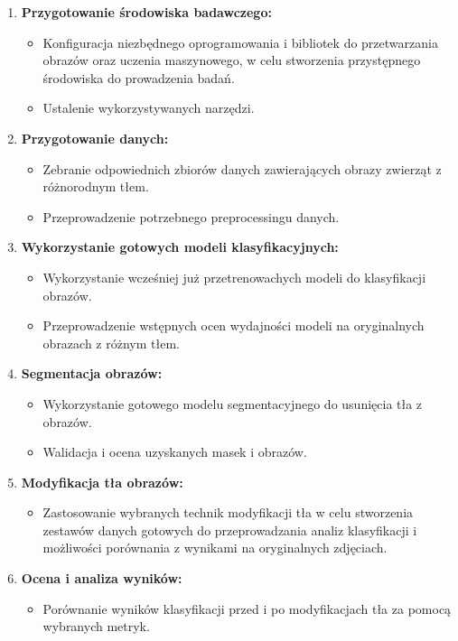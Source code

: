 \begin{enumerate}
    \item \textbf{Przygotowanie środowiska badawczego:}
    \begin{itemize}
        \item Konfiguracja niezbędnego oprogramowania i bibliotek do przetwarzania obrazów oraz uczenia maszynowego, w celu stworzenia przystępnego środowiska do prowadzenia badań. 
        \item Ustalenie wykorzystywanych narzędzi.
    \end{itemize}
    \item \textbf{Przygotowanie danych:}
    \begin{itemize}
        \item Zebranie odpowiednich zbiorów danych zawierających obrazy zwierząt z różnorodnym tłem.
        \item Przeprowadzenie potrzebnego preprocessingu danych.
    \end{itemize}
    \item \textbf{Wykorzystanie gotowych modeli klasyfikacyjnych:}
    \begin{itemize}
        \item Wykorzystanie wcześniej już przetrenowachych modeli do klasyfikacji obrazów.
        \item Przeprowadzenie wstępnych ocen wydajności modeli na oryginalnych obrazach z różnym tłem.
    \end{itemize}
    \item \textbf{Segmentacja obrazów:}
    \begin{itemize}
        \item Wykorzystanie gotowego modelu segmentacyjnego do usunięcia tła z obrazów.
        \item Walidacja i ocena uzyskanych masek i obrazów.
    \end{itemize}
    \item \textbf{Modyfikacja tła obrazów:}
    \begin{itemize}
        \item Zastosowanie wybranych technik modyfikacji tła w celu stworzenia zestawów danych gotowych do przeprowadzania analiz klasyfikacji i możliwości porównania z wynikami na oryginalnych zdjęciach. 
    \end{itemize}
    \item \textbf{Ocena i analiza wyników:}
    \begin{itemize}
        \item Porównanie wyników klasyfikacji przed i po modyfikacjach tła za pomocą wybranych metryk.

\end{itemize}
\end{enumerate}
